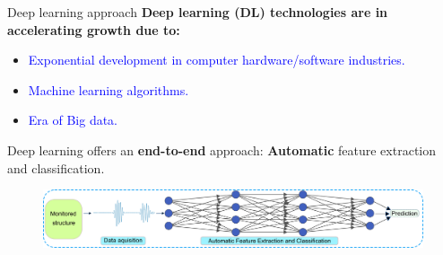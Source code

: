\documentclass[10pt,aspectratio=169,dvipsnames]{beamer} %
\begin{document}
	\setcounter{subfigure}{0}
	\begin{frame}{Deep learning approach}
		\textbf{Deep learning (DL) technologies are in accelerating growth due to:}
		\begin{itemize}
			\item \textcolor{blue}{Exponential development in computer hardware/software industries.}
			\item \textcolor{blue}{Machine learning algorithms.}
			\item \textcolor{blue}{Era of Big data.}
		\end{itemize}	
		Deep learning offers an \alert{\textbf{end-to-end}} approach: \alert{\textbf{Automatic}} feature extraction and classification.
		\begin{figure}
			\includegraphics[width=.95\textwidth]{DL_approach.png}
		\end{figure}
	\end{frame}
\end{document}
